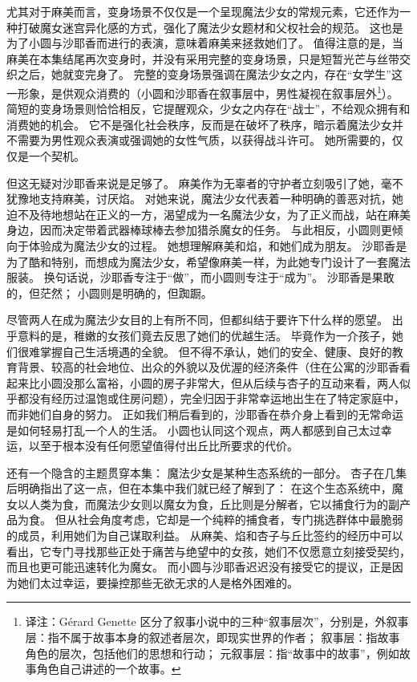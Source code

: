 尤其对于麻美而言，变身场景不仅仅是一个呈现魔法少女的常规元素，它还作为一种打破魔女迷宫异化感的方式，强化了魔法少女题材和父权社会的规范。
这也是为了小圆与沙耶香而进行的表演，意味着麻美来拯救她们了。
值得注意的是，当麻美在本集结尾再次变身时，并没有采用完整的变身场景，只是短暂光芒与丝带交织之后，她就变完身了。
完整的变身场景强调在魔法少女之内，存在“女学生”这一形象，是供观众消费的（小圆和沙耶香在叙事层中，男性凝视在叙事层外\footnote{%
    译注：Gérard Genette 区分了叙事小说中的三种“叙事层次”，分别是，外叙事层：指不属于故事本身的叙述者层次，即现实世界的作者；
    叙事层：指故事角色的层次，包括他们的思想和行动；
    元叙事层：指“故事中的故事”，例如故事角色自己讲述的一个故事。
}）。
简短的变身场景则恰恰相反，它提醒观众，少女之内存在“战士”，不给观众拥有和消费她的机会。
它不是强化社会秩序，反而是在破坏了秩序，暗示着魔法少女并不需要为男性观众表演或强调她的女性气质，以获得战斗许可。
她所需要的，仅仅是一个契机。

但这无疑对沙耶香来说是足够了。
麻美作为无辜者的守护者立刻吸引了她，毫不犹豫地支持麻美，讨厌焰。
对她来说，魔法少女代表着一种明确的善恶对抗，她迫不及待地想站在正义的一方，渴望成为一名魔法少女，为了正义而战，站在麻美身边，因而决定带着武器棒球棒去参加猎杀魔女的任务。
与此相反，小圆则更倾向于体验成为魔法少女的过程。
她想理解麻美和焰，和她们成为朋友。
沙耶香是为了酷和特别，而想成为魔法少女，希望像麻美一样，为此她专门设计了一套魔法服装。
换句话说，沙耶香专注于“做”，而小圆则专注于“成为”。
沙耶香是果敢的，但茫然；
小圆则是明确的，但踟蹰。

尽管两人在成为魔法少女目的上有所不同，但都纠结于要许下什么样的愿望。
出乎意料的是，稚嫩的女孩们竟去反思了她们的优越生活。
毕竟作为一介孩子，她们很难掌握自己生活境遇的全貌。
但不得不承认，她们的安全、健康、良好的教育背景、较高的社会地位、出众的外貌以及优渥的经济条件（住在公寓的沙耶香看起来比小圆没那么富裕，小圆的房子非常大，但从后续与杏子的互动来看，两人似乎都没有经历过温饱或住房问题），完全归因于非常幸运地出生在了特定家庭中，而非她们自身的努力。
正如我们稍后看到的，沙耶香在恭介身上看到的无常命运是如何轻易打乱一个人的生活。
小圆也认同这个观点，两人都感到自己太过幸运，以至于根本没有任何愿望值得付出丘比所要求的代价。

还有一个隐含的主题贯穿本集：
魔法少女是某种生态系统的一部分。
杏子在几集后明确指出了这一点，但在本集中我们就已经了解到了：
在这个生态系统中，魔女以人类为食，而魔法少女则以魔女为食，丘比则是分解者，它以捕食行为的副产品为食。
但从社会角度考虑，它却是一个纯粹的捕食者，专门挑选群体中最脆弱的成员，利用她们为自己谋取利益。
从麻美、焰和杏子与丘比签约的经历中可以看出，它专门寻找那些正处于痛苦与绝望中的女孩，她们不仅愿意立刻接受契约，而且也更可能迅速转化为魔女。
而小圆与沙耶香迟迟没有接受它的提议，正是因为她们太过幸运，要操控那些无欲无求的人是格外困难的。

